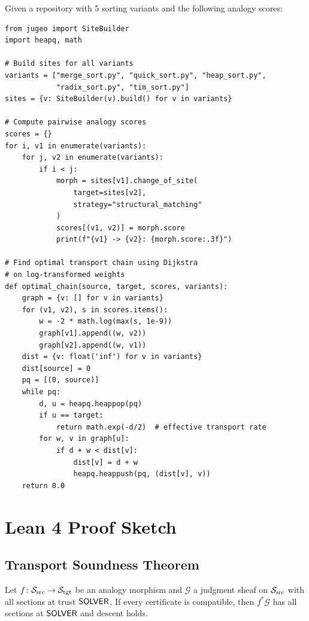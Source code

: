 \documentclass[11pt]{article}
\newcommand{\SourceSite}{\Site_{\mathrm{src}}}
\newcommand{\TargetSite}{\Site_{\mathrm{tgt}}}
\begin{document}
\begin{example}\label{ex:dijkstra}
Given a repository with 5 sorting variants and the following analogy
scores:

\begin{lstlisting}[style=jugeo-python]
from jugeo import SiteBuilder
import heapq, math

# Build sites for all variants
variants = ["merge_sort.py", "quick_sort.py", "heap_sort.py",
            "radix_sort.py", "tim_sort.py"]
sites = {v: SiteBuilder(v).build() for v in variants}

# Compute pairwise analogy scores
scores = {}
for i, v1 in enumerate(variants):
    for j, v2 in enumerate(variants):
        if i < j:
            morph = sites[v1].change_of_site(
                target=sites[v2],
                strategy="structural_matching"
            )
            scores[(v1, v2)] = morph.score
            print(f"{v1} -> {v2}: {morph.score:.3f}")

# Find optimal transport chain using Dijkstra
# on log-transformed weights
def optimal_chain(source, target, scores, variants):
    graph = {v: [] for v in variants}
    for (v1, v2), s in scores.items():
        w = -2 * math.log(max(s, 1e-9))
        graph[v1].append((w, v2))
        graph[v2].append((w, v1))
    dist = {v: float('inf') for v in variants}
    dist[source] = 0
    pq = [(0, source)]
    while pq:
        d, u = heapq.heappop(pq)
        if u == target:
            return math.exp(-d/2)  # effective transport rate
        for w, v in graph[u]:
            if d + w < dist[v]:
                dist[v] = d + w
                heapq.heappush(pq, (dist[v], v))
    return 0.0
\end{lstlisting}
\end{example}

\section{Lean 4 Proof Sketch}\label{sec:soundness}

\subsection{Transport Soundness Theorem}

\begin{theorem}\label{thm:transport-soundness}
Let $f \colon \SourceSite \to \TargetSite$ be an analogy morphism and
$\mathcal{G}$ a judgment sheaf on $\SourceSite$ with all sections at
trust $\mathsf{SOLVER}$.  If every certificate is compatible, then
$f^{*}\mathcal{G}$ has all sections at $\mathsf{SOLVER}$ and descent holds.
\end{theorem}
\end{document}
